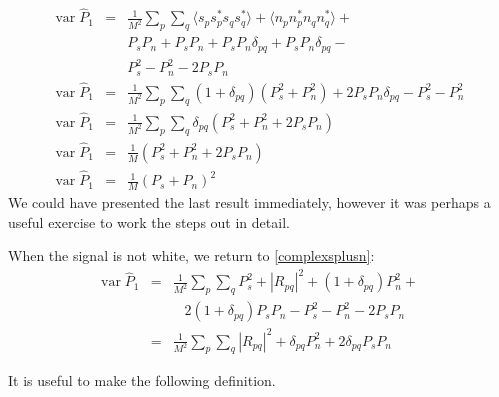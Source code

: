 \begin{eqnarray}
\textrm{var}\;\hat{P}_1 &=& \frac{1}{M^2} \sum_p \sum_q 
  \langle s_p s_p^\ast s_q s_q^\ast \rangle + 
  \langle n_p n_p^\ast n_q n_q^\ast \rangle + \nonumber \\ 
& & P_s P_n + P_s P_n + P_s P_n \delta_{pq} + P_s P_n \delta_{pq} - \nonumber \\
& & P_s^2 - P_n^2 - 2 P_s P_n \label{e:complexsplusn} \\
\textrm{var}\;\hat{P}_1 &=& \frac{1}{M^2} \sum_p \sum_q 
  (1 + \delta_{pq}) (P_s^2 + P_n^2) + 2P_s P_n \delta_{pq} 
 - P_s^2 - P_n^2 \nonumber \\
\textrm{var}\;\hat{P}_1 &=& \frac{1}{M^2} \sum_p \sum_q 
  \delta_{pq} (P_s^2 + P_n^2 + 2P_s P_n) \\
\textrm{var}\;\hat{P}_1 &=& \frac{1}{M} (P_s^2 + P_n^2 + 2P_s P_n) \\
\textrm{var}\;\hat{P}_1 &=& \frac{1}{M} (P_s + P_n)^2 
\end{eqnarray}
We could have presented the last result immediately, however it was
perhaps a useful exercise to work the steps out in detail. 

When the signal is not white, we return to \eqref{complexsplusn}:
\begin{eqnarray}
\textrm{var}\;\hat{P}_1 &=& \frac{1}{M^2} \sum_p \sum_q 
  P_s^2 + |R_{pq}|^2 + (1 + \delta_{pq})P_n^2 + \nonumber \\
& & \;\;\; 2(1 + \delta_{pq}) P_s P_n - P_s^2 - P_n^2 - 2 P_s P_n \\
&=& \frac{1}{M^2} \sum_p \sum_q 
  |R_{pq}|^2 + \delta_{pq} P_n^2 + 2 \delta_{pq} P_s P_n 
\end{eqnarray}

It is useful to make the following definition.


